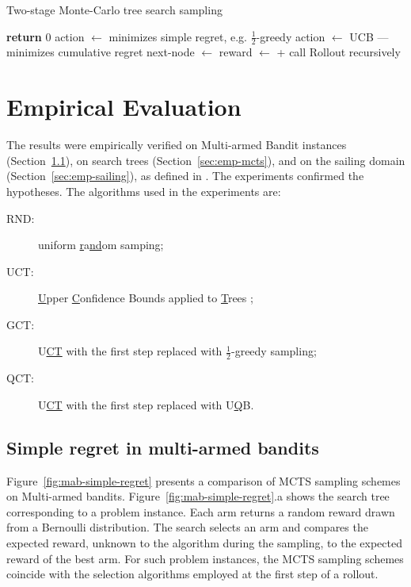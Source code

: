 \documentclass{article}
\begin{document}
\begin{algorithm}[t]
\caption{Two-stage Monte-Carlo tree search sampling}
\label{alg:two-stage-mcts}
\begin{algorithmic}[1]
    \State \textbf{return} 0
  \Else
      \State action $\gets$  \Comment minimizes simple regret, e.g. $\frac 1 2$-greedy
    \Else
      \State action $\gets$  \Comment  UCB --- minimizes cumulative regret
    \EndIf
    \State next-node $\gets$ 
    \State reward $\gets$ 
    \State \hspace{4em} +  \Comment call {\sc Rollout} recursively
    \State {}
  \EndIf
\EndProcedure
\end{algorithmic}
\end{algorithm}

\section{Empirical Evaluation}
\label{sec:emp}

The results were empirically verified on Multi-armed Bandit instances
(Section~\ref{sec:emp-mab}), on search trees
(Section~\ref{sec:emp-mcts}), and on the sailing domain
(Section~\ref{sec:emp-sailing}), as defined in \cite{Kocsis.uct}. The
experiments confirmed the hypotheses. The algorithms used in the
experiments are:
\begin{description}
\item[RND:] uniform \underline{r}a\underline{nd}om samping;
\item[UCT:] \underline{U}pper \underline{C}onfidence Bounds applied to
  \underline{T}rees \cite{Kocsis.uct};
\item[GCT:] U\underline{CT} with the first step
  replaced with $\frac 1 2$-\underline{g}reedy sampling;
\item[QCT:] U\underline{CT} with the first step
  replaced with U\underline{Q}B.
\end{description}

\subsection{Simple regret in multi-armed bandits}
\label{sec:emp-mab}

Figure~\ref{fig:mab-simple-regret} presents a comparison of MCTS sampling
schemes on Multi-armed bandits. Figure~\ref{fig:mab-simple-regret}.a shows the search tree
corresponding to a problem instance. Each arm returns a random reward
drawn from a Bernoulli distribution. The search selects an arm
and compares the expected reward, unknown to the algorithm during the
sampling, to the expected reward of the best arm. For such problem
instances, the MCTS sampling schemes coincide with the selection
algorithms employed at the first step of a rollout.
\end{document}
